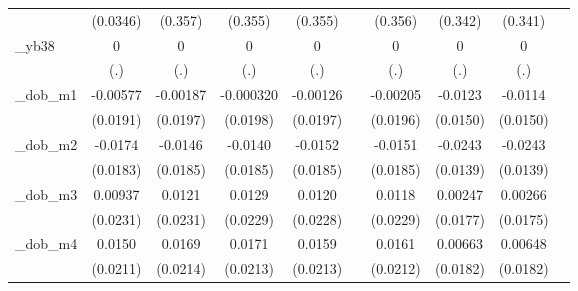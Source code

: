 \begin{table}[htbp]
\begin{tabular}{l*{9}{c}}
            &    (0.0346)         &     (0.357)         &     (0.355)         &     (0.355)         &                     &     (0.356)         &     (0.342)         &     (0.341)         &                     \\
[1em]
\_yb38       &           0         &           0         &           0         &           0         &                     &           0         &           0         &           0         &                     \\
            &         (.)         &         (.)         &         (.)         &         (.)         &                     &         (.)         &         (.)         &         (.)         &                     \\
[1em]
\_dob\_m1     &    -0.00577         &    -0.00187         &   -0.000320         &    -0.00126         &                     &    -0.00205         &     -0.0123         &     -0.0114         &                     \\
            &    (0.0191)         &    (0.0197)         &    (0.0198)         &    (0.0197)         &                     &    (0.0196)         &    (0.0150)         &    (0.0150)         &                     \\
[1em]
\_dob\_m2     &     -0.0174         &     -0.0146         &     -0.0140         &     -0.0152         &                     &     -0.0151         &     -0.0243\sym{*}  &     -0.0243\sym{*}  &                     \\
            &    (0.0183)         &    (0.0185)         &    (0.0185)         &    (0.0185)         &                     &    (0.0185)         &    (0.0139)         &    (0.0139)         &                     \\
[1em]
\_dob\_m3     &     0.00937         &      0.0121         &      0.0129         &      0.0120         &                     &      0.0118         &     0.00247         &     0.00266         &                     \\
            &    (0.0231)         &    (0.0231)         &    (0.0229)         &    (0.0228)         &                     &    (0.0229)         &    (0.0177)         &    (0.0175)         &                     \\
[1em]
\_dob\_m4     &      0.0150         &      0.0169         &      0.0171         &      0.0159         &                     &      0.0161         &     0.00663         &     0.00648         &                     \\
            &    (0.0211)         &    (0.0214)         &    (0.0213)         &    (0.0213)         &                     &    (0.0212)         &    (0.0182)         &    (0.0182)         &                     \\

\end{tabular}
\end{table}
